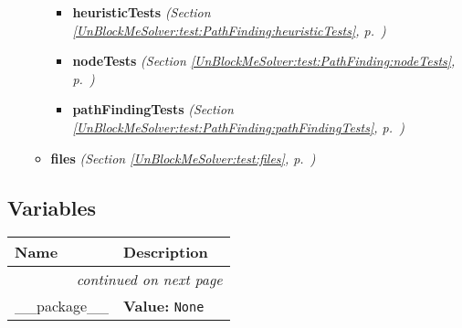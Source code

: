 \begin{itemize}
\begin{itemize}
\begin{itemize}
        \item \textbf{heuristicTests}
  \textit{(Section \ref{UnBlockMeSolver:test:PathFinding:heuristicTests}, p.~\pageref{UnBlockMeSolver:test:PathFinding:heuristicTests})}

        \item \textbf{nodeTests}
  \textit{(Section \ref{UnBlockMeSolver:test:PathFinding:nodeTests}, p.~\pageref{UnBlockMeSolver:test:PathFinding:nodeTests})}

        \item \textbf{pathFindingTests}
  \textit{(Section \ref{UnBlockMeSolver:test:PathFinding:pathFindingTests}, p.~\pageref{UnBlockMeSolver:test:PathFinding:pathFindingTests})}

      \end{itemize}
    \item \textbf{files}
  \textit{(Section \ref{UnBlockMeSolver:test:files}, p.~\pageref{UnBlockMeSolver:test:files})}

  \end{itemize}
\end{itemize}



  \subsection{Variables}

    \vspace{-1cm}
\hspace{\varindent}\begin{longtable}{|p{\varnamewidth}|p{\vardescrwidth}|l}
\cline{1-2}
\cline{1-2} \centering \textbf{Name} & \centering \textbf{Description}& \\
\cline{1-2}
\endhead\cline{1-2}\multicolumn{3}{r}{\small\textit{continued on next page}}\\\endfoot\cline{1-2}
\endlastfoot\raggedright \_\-\_\-p\-a\-c\-k\-a\-g\-e\-\_\-\_\- & \raggedright \textbf{Value:} 
{\tt None}&\\
\cline{1-2}
\end{longtable}

